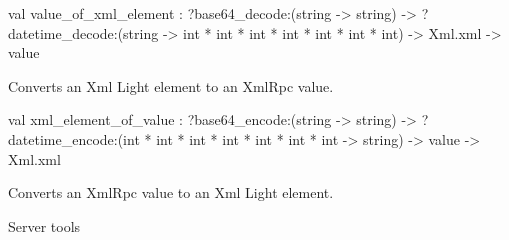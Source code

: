 \documentclass[11pt]{article}
\begin{document}
\label{val:XmlRpc.value-underscoreof-underscorexml-underscoreelement}\begin{ocamldoccode}
val value_of_xml_element :
  ?base64_decode:(string -> string) ->
  ?datetime_decode:(string -> int * int * int * int * int * int * int) ->
  Xml.xml -> value
\end{ocamldoccode}
\begin{ocamldocdescription}
Converts an Xml Light element to an XmlRpc value.


\end{ocamldocdescription}




\label{val:XmlRpc.xml-underscoreelement-underscoreof-underscorevalue}\begin{ocamldoccode}
val xml_element_of_value :
  ?base64_encode:(string -> string) ->
  ?datetime_encode:(int * int * int * int * int * int * int -> string) ->
  value -> Xml.xml
\end{ocamldoccode}
\begin{ocamldocdescription}
Converts an XmlRpc value to an Xml Light element.


\end{ocamldocdescription}




Server tools
\end{document}
